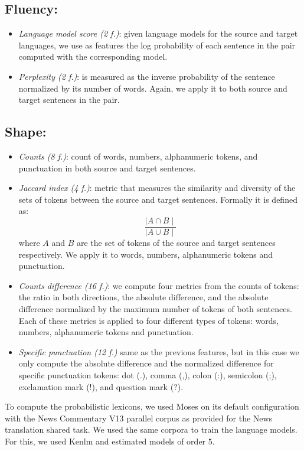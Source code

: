 \documentclass[a0]{sciposter}
\begin{document}
\begin{multicols*}{2}
\subsection*{Fluency:} 
\begin{itemize}
  \item \textit{Language model score (2 f.)}: given language models for the source and target languages, we use as features the log probability of each sentence in the pair computed with the corresponding model.
  \item \textit{Perplexity (2 f.)}: is measured as the inverse probability of the sentence normalized by its number of words. Again, we apply it to both source and target sentences in the pair.
\end{itemize}

\subsection*{Shape:}
\begin{itemize}
  \item \textit{Counts (8 f.)}: count of words, numbers, alphanumeric tokens, and punctuation in both source and target sentences.
  \item \textit{Jaccard index (4 f.)}: metric that measures the similarity and diversity of the sets of tokens between the source and target sentences. Formally it is defined as:
  $$ \frac{\mid A\cap B\mid}{\mid A\cup B\mid}$$
  where $A$ and $B$ are the set of tokens of the source and target sentences respectively. We apply it to words, numbers, alphanumeric tokens and punctuation.
  \item \textit{Counts difference (16 f.)}: we compute four metrics from the counts of tokens: the ratio in both directions, the absolute difference, and the absolute difference normalized by the maximum number of tokens of both sentences. Each of these metrics is applied to four different types of tokens: words, numbers, alphanumeric tokens and punctuation.
  \item \textit{Specific punctuation (12 f.)} same as the previous features, but in this case we only compute the absolute difference and the normalized difference for specific punctuation tokens: dot (.), comma (,), colon (:), semicolon (;), exclamation mark (!), and question mark (?).
\end{itemize}

To compute the probabilistic lexicons, we used Moses on its default configuration with the News Commentary V13 parallel corpus as provided for the News translation shared task. We used the same corpora to train the language models. For this, we used Kenlm and estimated models of order $5$.



\end{multicols*}
\end{document}
